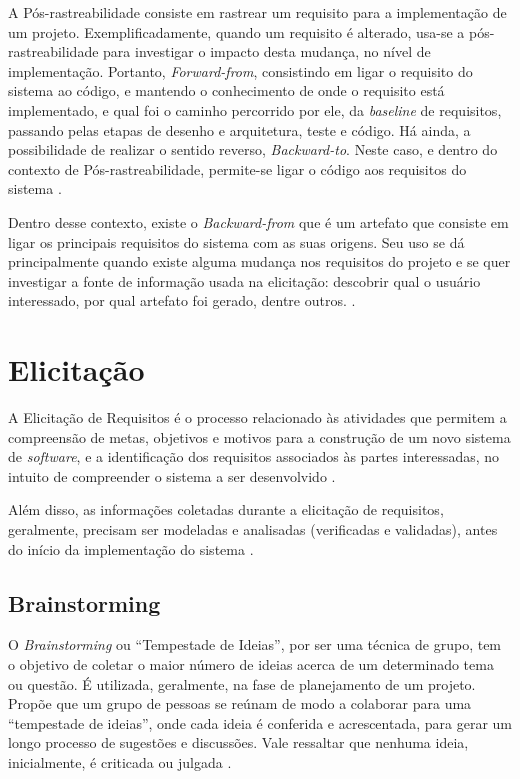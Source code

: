 \label{sec:pos-rastreabilidade}

A Pós-rastreabilidade consiste em rastrear um requisito para a implementação de um projeto. Exemplificadamente, quando um requisito é alterado, usa-se a pós-rastreabilidade para investigar o impacto desta mudança, no nível de implementação. Portanto, \textit{Forward-from}, consistindo em ligar o requisito do sistema ao código, e mantendo o conhecimento de onde o requisito está implementado, e qual foi o caminho percorrido por ele, da \textit{baseline} de requisitos, passando pelas etapas de desenho e arquitetura, teste e código. Há ainda, a possibilidade de realizar o sentido reverso, \textit{Backward-to}. Neste caso, e dentro do contexto de Pós-rastreabilidade, permite-se ligar o código aos requisitos do sistema \cite{pinheiro2004requirements}.

Dentro desse contexto, existe o \textit{Backward-from} que é um artefato que consiste em ligar os principais requisitos do sistema com as suas origens. Seu uso se dá principalmente quando existe alguma mudança nos requisitos do projeto e se quer investigar a fonte de informação usada na elicitação: descobrir qual o usuário interessado, por qual artefato foi gerado, dentre outros. \cite{pinheiro2004requirements}.

\section {Elicitação}

\label{sec:elicitacao}

A Elicitação de Requisitos é o processo relacionado às atividades que permitem a compreensão de metas, objetivos e motivos para a construção de um novo sistema de \textit{software}, e a identificação dos requisitos associados às partes interessadas, no intuito de compreender o sistema a ser desenvolvido \cite{elliott2012software}.

Além disso, as informações coletadas durante a elicitação de requisitos, geralmente, precisam ser modeladas e analisadas (verificadas e validadas), antes do início da implementação do sistema \cite{nuseibeh2000requirements}.

\subsection{Brainstorming}

\label{sec:brainstorming}

O \textit{Brainstorming} ou “Tempestade de Ideias”, por ser uma técnica de grupo, tem o objetivo de coletar o maior número de ideias acerca de um determinado tema ou questão. É utilizada, geralmente, na fase de planejamento de um projeto. Propõe que um grupo de pessoas se reúnam de modo a colaborar para uma “tempestade de ideias”, onde cada ideia é conferida e acrescentada, para gerar um longo processo de sugestões e discussões. Vale ressaltar que nenhuma ideia, inicialmente, é criticada ou julgada \cite{mazzotti2012exploraccao}.


